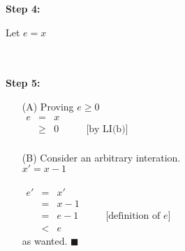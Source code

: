\documentclass[12pt]{article}
\renewcommand{\qed}{\hfill$\blacksquare$}
\begin{document}
\noindent \textbf{Step 4:} %

\hfill\begin{minipage}{\dimexpr\textwidth-10mm}
	{Let $e = x$}
\end{minipage}
\\\\
\textbf{Step 5:} %

\hfill\begin{minipage}{\dimexpr\textwidth-10mm}
	\begin{itemize}
		\item [(A)] Proving $e \geq 0$\\
		      $\begin{array}{lcll}
				      e & =    & x        &                   \\
				        & \geq & 0 \qquad & \text{[by LI(b)]} \\
			      \end{array}$
		\item [(B)] Consider an arbitrary interation.
		      \\
		      $x' = x-1$ \qquad [line 3]
		      \\\\
		      $\begin{array}{lcll}
				      e' & = & x'    & \\
				         & = & x-1   & \\
				         & = & e - 1 \qquad& \text{[definition of $e$]}\\
				         & < & e     &
			      \end{array}$\\
		      as wanted. \qed

	\end{itemize}
\end{minipage}
\end{document}
